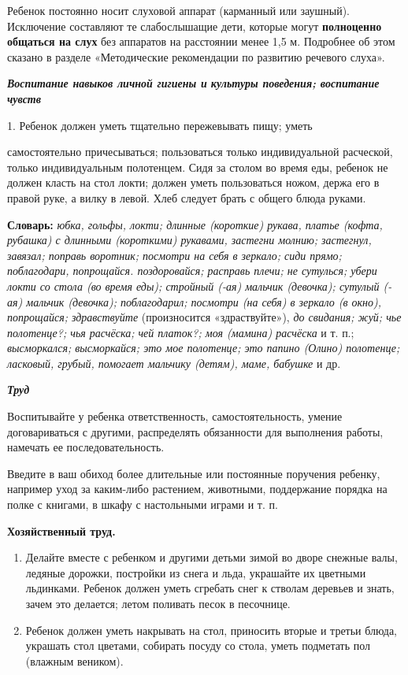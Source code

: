 \documentclass[a5paper]{book}
\renewcommand{\emph}[1]{\textit{#1}}
\begin{document}
Ребенок постоянно носит слуховой аппарат (карманный или заушный).
Исключение составляют те слабослышащие дети, которые могут
\textbf{полноценно общаться на слух} без аппаратов на расстоянии менее
1,5 м. Подробнее об этом сказано в разделе «Методические рекомендации по
развитию речевого слуха».

\emph{\textbf{Воспитание навыков личной гигиены и} \textbf{культуры
поведения; воспитание чувств}}

1. Ребенок должен уметь тщательно пережевывать пищу; уметь

самостоятельно причесываться; пользоваться только индивидуальной
расческой, только индивидуальным полотенцем. Сидя за столом во время
еды, ребенок не должен класть на стол локти; должен уметь пользоваться
ножом, держа его в правой руке, а вилку в левой. Хлеб следует брать с
общего блюда руками.

\textbf{Словарь:} \emph{юбка, гольфы, локти; длинные (короткие) рукава,
платье (кофта, рубашка) с длинными (короткими) рукавами, застегни
молнию; застегнул, завязал; поправь воротник; посмотри на себя в
зеркало; сиди прямо; поблагодари, попрощайся. поздоровайся; расправь
плечи; не сутулься; убери локти со стола (во время еды); стройный (-ая)
мальчик (девочка); сутулый (-ая) мальчик (девочка); поблагодарил;
посмотри (на себя) в зеркало (в окно), попрощайся; здравствуйте}
(произносится «здраствуйте»), \emph{до свидания; жуй; чье полотенце?;
чья расчёска; чей платок?; моя (мамина) расчёска} и т. п.;
\emph{высморкался; высморкайся; это мое полотенце; это папино (Олино)
полотенце; ласковый, грубый, помогает мальчику (детям), маме, бабушке} и
др.

\emph{\textbf{Труд}}

Воспитывайте у ребенка ответственность, самостоятельность, умение
договариваться с другими, распределять обязанности для выполнения
работы, намечать ее последовательность.

Введите в ваш обиход более длительные или постоянные поручения ребенку,
например уход за каким-либо растением, животными, поддержание порядка на
полке с книгами, в шкафу с настольными играми и т. п.

\textbf{Хозяйственный труд.}


\begin{enumerate}
\def\labelenumi{\arabic{enumi}.}
\item
  
  Делайте вместе с ребенком и другими детьми зимой во дворе снежные
  валы, ледяные дорожки, постройки из снега и льда, украшайте их
  цветными льдинками. Ребенок должен уметь сгребать снег к стволам
  деревьев и знать, зачем это делается; летом поливать песок в
  песочнице.
  
\item
  
  Ребенок должен уметь накрывать на стол, приносить вторые и третьи
  блюда, украшать стол цветами, собирать посуду со стола, уметь
  подметать пол (влажным веником).
  
\end{enumerate}
\end{document}
